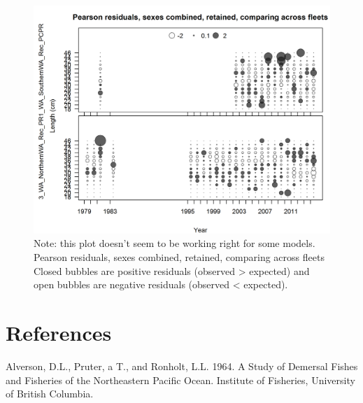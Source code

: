 \documentclass[12pt,]{article}
\begin{document}
\begin{figure}[htbp]
\centering
\includegraphics{./r4ss/plots_mod1/comp_lenfit_sex1mkt2_multi-fleet_comparison.png}
\caption{Note: this plot doesn't seem to be working right for some
models. Pearson residuals, sexes combined, retained, comparing across
fleets\\
Closed bubbles are positive residuals (observed \textgreater{} expected)
and open bubbles are negative residuals (observed \textless{} expected).
\label{fig:mod1_10_comp_lenfit_sex1mkt2_multi-fleet_comparison}}
\end{figure}

\FloatBarrier

\FloatBarrier

\FloatBarrier

\FloatBarrier

\FloatBarrier

\FloatBarrier

\FloatBarrier

\newpage

\color{black}

\section*{References}\label{references}

\renewcommand{\thepage}{}

\hypertarget{refs}{}
\hypertarget{ref-Alverson1964}{}
Alverson, D.L., Pruter, a T., and Ronholt, L.L. 1964. A Study of
Demersal Fishes and Fisheries of the Northeastern Pacific Ocean.
Institute of Fisheries, University of British Columbia.
\end{document}
